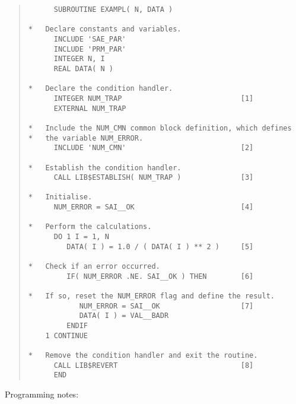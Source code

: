 \begin{quote}
\begin{verbatim}
      SUBROUTINE EXAMPL( N, DATA )

*   Declare constants and variables.
      INCLUDE 'SAE_PAR'
      INCLUDE 'PRM_PAR'
      INTEGER N, I
      REAL DATA( N )

*   Declare the condition handler.
      INTEGER NUM_TRAP                            [1]
      EXTERNAL NUM_TRAP

*   Include the NUM_CMN common block definition, which defines
*   the variable NUM_ERROR.
      INCLUDE 'NUM_CMN'                           [2]

*   Establish the condition handler.
      CALL LIB$ESTABLISH( NUM_TRAP )              [3]

*   Initialise.
      NUM_ERROR = SAI__OK                         [4]

*   Perform the calculations.
      DO 1 I = 1, N
         DATA( I ) = 1.0 / ( DATA( I ) ** 2 )     [5]

*   Check if an error occurred.
         IF( NUM_ERROR .NE. SAI__OK ) THEN        [6]

*   If so, reset the NUM_ERROR flag and define the result.
            NUM_ERROR = SAI__OK                   [7]
            DATA( I ) = VAL__BADR
         ENDIF
    1 CONTINUE

*   Remove the condition handler and exit the routine.
      CALL LIB$REVERT                             [8]
      END
\end{verbatim}
\end{quote}

Programming notes:

